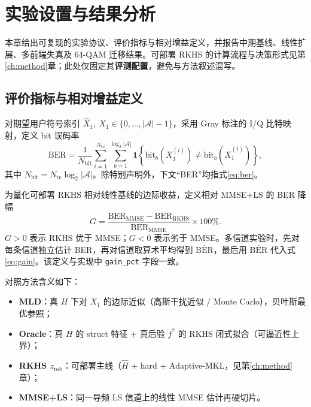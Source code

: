\chapter{实验设置与结果分析}
\label{ch:exp}

本章给出可复现的实验协议、评价指标与相对增益定义，并报告中期基线、线性扩展、多前端失真及 64-QAM 迁移结果。可部署 RKHS 的计算流程与决策形式见第\ref{ch:method}章；此处仅固定其\textbf{评测配置}，避免与方法叙述混写。

\section{评价指标与相对增益定义}
\label{sec:metric}

对期望用户符号索引 $\hat X_1,\ X_1\in\{0,\ldots,|\mathcal{A}|-1\}$，采用 Gray 标注的 I/Q 比特映射，定义 bit 误码率
\begin{equation}
\mathrm{BER}
=\frac{1}{N_{\mathrm{bit}}}
\sum_{i=1}^{N_{\mathrm{te}}}
\sum_{b=1}^{\log_2|\mathcal{A}|}
\mathbf{1}\!\left\{
\mathrm{bit}_b(X_1^{(i)})\neq\mathrm{bit}_b(\hat X_1^{(i)})
\right\},
\label{eq:ber}
\end{equation}
其中 $N_{\mathrm{bit}}=N_{\mathrm{te}}\log_2|\mathcal{A}|$。除特别声明外，下文“BER”均指式\eqref{eq:ber}。

为量化可部署 RKHS 相对线性基线的边际收益，定义相对 MMSE+LS 的 BER 降幅
\begin{equation}
G
=\frac{\mathrm{BER}_{\mathrm{MMSE}}-\mathrm{BER}_{\mathrm{RKHS}}}{\mathrm{BER}_{\mathrm{MMSE}}}
\times 100\%.
\label{eq:gain}
\end{equation}
$G>0$ 表示 RKHS 优于 MMSE；$G<0$ 表示劣于 MMSE。多信道实验时，先对每条信道独立估计 BER，再对信道取算术平均得到 $\overline{\mathrm{BER}}$，最后用 $\overline{\mathrm{BER}}$ 代入式\eqref{eq:gain}。该定义与实现中 \texttt{gain\_pct} 字段一致。

对照方法含义如下：
\begin{itemize}[leftmargin=2em]
  \item \textbf{MLD}：真 $H$ 下对 $X_1$ 的边际近似（高斯干扰近似 / Monte Carlo），贝叶斯最优参照；
  \item \textbf{Oracle}：真 $H$ 的 struct 特征 + 真后验 $f^*$ 的 RKHS 闭式拟合（可逼近性上界）；
  \item \textbf{RKHS $z_{\mathrm{rob}}$}：可部署主线（$\hat H$ + hard + Adaptive-MKL，见第\ref{ch:method}章）；
  \item \textbf{MMSE+LS}：同一导频 LS 信道上的线性 MMSE 估计再硬切片。
\end{itemize}

